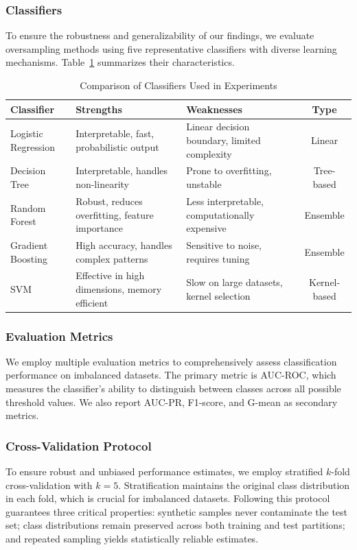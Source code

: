 \documentclass{ijSmartGrid}
\theoremstyle{definition}
\begin{document}
\subsubsection{Classifiers}
\indent To ensure the robustness and generalizability of our findings, we evaluate oversampling methods using five representative classifiers with diverse learning mechanisms. Table~\ref{tab:classifiers} summarizes their characteristics.

\begin{table}[!ht]
  \centering
  \caption{Comparison of Classifiers Used in Experiments}
  \label{tab:classifiers}
  \begin{tabular}{lp{3.5cm}p{3.5cm}c}
    \toprule
    \textbf{Classifier} & \textbf{Strengths} & \textbf{Weaknesses} & \textbf{Type} \\
    \midrule
    Logistic Regression & Interpretable, fast, probabilistic output & Linear decision boundary, limited complexity & Linear \\
    Decision Tree & Interpretable, handles non-linearity & Prone to overfitting, unstable & Tree-based \\
    Random Forest & Robust, reduces overfitting, feature importance & Less interpretable, computationally expensive & Ensemble \\
    Gradient Boosting & High accuracy, handles complex patterns & Sensitive to noise, requires tuning & Ensemble \\
    SVM & Effective in high dimensions, memory efficient & Slow on large datasets, kernel selection & Kernel-based \\
    \bottomrule
  \end{tabular}
\end{table}

\subsubsection{Evaluation Metrics}
\indent We employ multiple evaluation metrics to comprehensively assess classification performance on imbalanced datasets. The primary metric is AUC-ROC, which measures the classifier's ability to distinguish between classes across all possible threshold values. We also report AUC-PR, F1-score, and G-mean as secondary metrics.

\subsubsection{Cross-Validation Protocol}
\indent To ensure robust and unbiased performance estimates, we employ stratified $k$-fold cross-validation with $k = 5$. Stratification maintains the original class distribution in each fold, which is crucial for imbalanced datasets. Following this protocol guarantees three critical properties: synthetic samples never contaminate the test set; class distributions remain preserved across both training and test partitions; and repeated sampling yields statistically reliable estimates.
\end{document}
